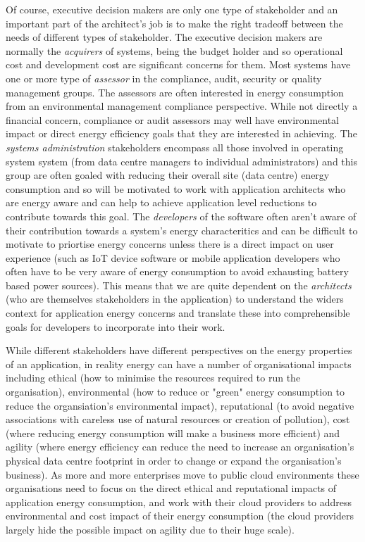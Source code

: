 Of course, executive decision makers are only one type of stakeholder and an important part of the architect's job is to make the right tradeoff between the needs of different types of stakeholder.  The executive decision makers are normally the \emph{acquirers} of systems, being the budget holder and so operational cost and development cost are significant concerns for them.  Most systems have one or more type of \emph{assessor} in the compliance, audit, security or quality management groups.  The assessors are often interested in energy consumption from an environmental management compliance perspective.  While not directly a financial concern, compliance or audit assessors may well have environmental impact or direct energy efficiency goals that they are interested in achieving.  The \emph{systems administration} stakeholders encompass all those involved in operating system system (from data centre managers to individual administrators) and this group are often goaled with reducing their overall site (data centre) energy consumption and so will be motivated to work with application architects who are energy aware and can help to achieve application level reductions to contribute towards this goal.  The \emph{developers} of the software often aren't aware of their contribution towards a system's energy characteritics and can be difficult to motivate to priortise energy concerns unless there is a direct impact on user experience (such as IoT device software or mobile application developers who often have to be very aware of energy consumption to avoid exhausting battery based power sources).  This means that we are quite dependent on the \emph{architects} (who are themselves stakeholders in the application) to understand the widers context for application energy concerns and translate these into comprehensible goals for developers to incorporate into their work.

While different stakeholders have different perspectives on the energy properties of an application, in reality energy can have a number of organisational impacts including ethical (how to minimise the resources required to run the organisation), environmental (how to reduce or "green" energy consumption to reduce the organsiation's environmental impact), reputational (to avoid negative associations with careless use of natural resources or creation of pollution), cost (where reducing energy consumption will make a business more efficient) and agility (where energy efficiency can reduce the need to increase an organisation's physical data centre footprint in order to change or expand the organisation's business).  As more and more enterprises move to public cloud environments \cite{idc2016-cloudreport} these organisations need to focus on the direct ethical and reputational impacts of application energy consumption, and work with their cloud providers to address environmental and cost impact of their energy consumption (the cloud providers largely hide the possible impact on agility due to their huge scale). 

